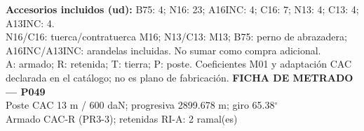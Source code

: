 \begingroup\scriptsize
\textbf{Accesorios incluidos (ud):} B75: 4; N16: 23; A16INC: 4; C16: 7; N13: 4; C13: 4; A13INC: 4.\\
N16/C16: tuerca/contratuerca M16; N13/C13: M13; B75: perno de abrazadera; A16INC/A13INC: arandelas incluidas. No sumar como compra adicional.\\
A: armado; R: retenida; T: tierra; P: poste. Coeficientes M01 y adaptación CAC declarada en el catálogo; no es plano de fabricación.
\endgroup\endgroup
\clearpage{}
\begingroup\small\setlength{\parskip}{3pt}\renewcommand{\arraystretch}{1.05}
\textbf{\large FICHA DE METRADO — P049}\\[4pt]
Poste CAC 13 m / 600 daN; progresiva 2899.678 m; giro 65.38\ensuremath{^\circ}\\
Armado CAC-R (PR3-3); retenidas RI-A: 2 ramal(es)\\
\begingroup\scriptsize
